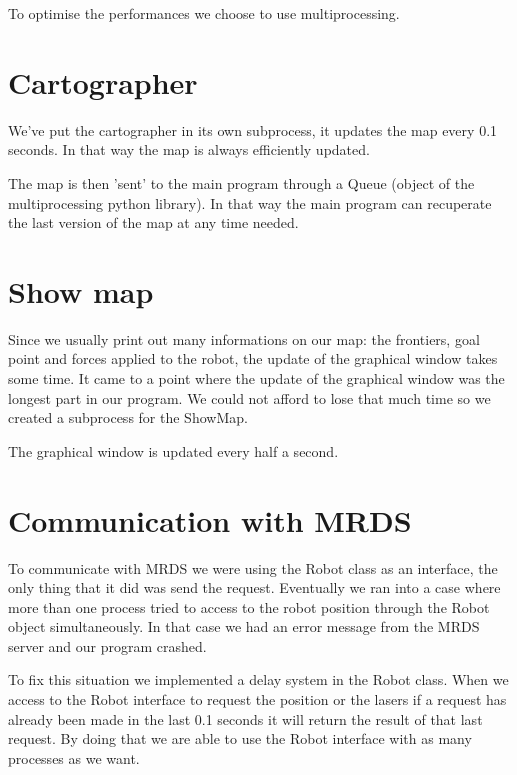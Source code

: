 To optimise the performances we choose to use multiprocessing.

\section{Cartographer}

We've put the cartographer in its own subprocess, it updates the map every 0.1 seconds.
In that way the map is always efficiently updated.

The map is then 'sent' to the main program through a Queue (object of the multiprocessing python library).
In that way the main program can recuperate the last version of the map at any time needed.

\section{Show map}

Since we usually print out many informations on our map: the frontiers, goal point and forces applied to the robot, the update of the graphical window takes some time.
It came to a point where the update of the graphical window was the longest part in our program.
We could not afford to lose that much time so we created a subprocess for the ShowMap.

The graphical window is updated every half a second.

\section{Communication with MRDS}

To communicate with MRDS we were using the Robot class as an interface, the only thing that it did was send the request.
Eventually we ran into a case where more than one process tried to access to the robot position through the Robot object simultaneously.
In that case we had an error message from the MRDS server and our program crashed.

To fix this situation we implemented a delay system in the Robot class.
When we access to the Robot interface to request the position or the lasers if a request has already been made in the last 0.1 seconds it will return the result of that last request.
By doing that we are able to use the Robot interface with as many processes as we want.

